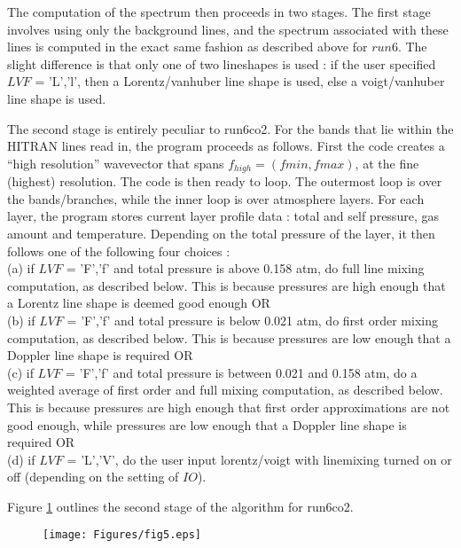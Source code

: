 \documentclass[11pt]{article}
\begin{document}
The computation of the spectrum then proceeds in two stages. The first 
stage 
involves using only the background lines, and the spectrum associated with 
these lines is computed in the exact same fashion as described above for 
$run6$. The slight difference is that only one of two lineshapes is used :
if the user specified $LVF$ = 'L','l', then a Lorentz/vanhuber line shape 
is used, else a voigt/vanhuber line shape is used.

The second stage is entirely peculiar to run6co2. For the bands that lie 
within the HITRAN lines read in, the program proceeds as follows. First the 
code creates a ``high resolution'' wavevector that spans 
$f_{high}=(fmin,fmax)$, at 
the fine (highest) resolution. The code is then ready to loop. The
outermost loop is over the bands/branches, while the inner loop is over 
atmosphere layers. For each layer, the program stores current layer profile 
data : total and self pressure, gas amount and temperature. Depending on 
the total pressure of the layer, it then follows one of the following four 
choices : \\
(a) if $LVF$  = 'F','f' and total pressure is above 0.158 atm, do full line
    mixing computation, as described below. This is because pressures are
    high enough that a Lorentz line shape is deemed good enough OR\\
(b) if $LVF$  = 'F','f' and total pressure is below 0.021 atm, do first 
    order
    mixing computation, as described below. This is because pressures are
    low enough that a Doppler line shape is required OR\\
(c) if $LVF$  = 'F','f' and total pressure is between 0.021 and 0.158 atm, 
    do a weighted average of first order and full mixing computation, as 
    described below. This is because pressures are high enough that first 
    order approximations are not good enough, while pressures are low 
    enough 
    that a Doppler line shape is required OR \\
(d) if $LVF$ = 'L','V', do the user input lorentz/voigt with linemixing 
    turned on or off (depending on the setting of $IO$).

Figure \ref{fig:PQRloop_CO2} outlines the second stage of the algorithm for 
run6co2.

\begin{figure}[h]
  \begin{center}\texttt{[image: Figures/fig5.eps]}
  \end{center}
  \caption[Outline of PQR band loop details for CO2]{}
  \label{fig:PQRloop_CO2}
\end{figure}
\end{document}
